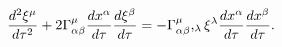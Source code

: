 \begin{equation}
\frac{d^{2}\xi ^{\mu }}{d\tau ^{2}}+2\Gamma _{\alpha \beta }^{\mu }\frac{%
dx^{\alpha }}{d\tau }\frac{d\xi ^{\beta }}{d\tau }=-\Gamma _{\alpha \beta
}^{\mu },_{\lambda }\xi ^{\lambda }\frac{dx^{\alpha }}{d\tau }\frac{%
dx^{\beta }}{d\tau }.  \label{8}
\end{equation}

